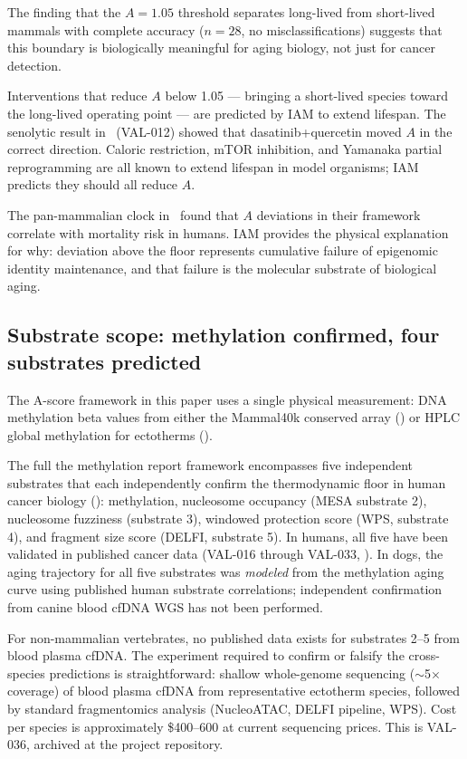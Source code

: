 \documentclass[11pt,a4paper]{article}
\newcommand{\Ascore}{A}
\begin{document}
The finding that the $\Ascore = 1.05$ threshold separates long-lived from
short-lived mammals with complete accuracy ($n = 28$, no misclassifications)
suggests that this boundary is biologically meaningful for aging biology,
not just for cancer detection.

Interventions that reduce $\Ascore$ below 1.05 --- bringing a short-lived
species toward the long-lived operating point --- are predicted by IAM to
extend lifespan. The senolytic result in~\citet{Mahaffey2026} (VAL-012)
showed that dasatinib+quercetin moved $\Ascore$ in the correct direction.
Caloric restriction, mTOR inhibition, and Yamanaka partial reprogramming
are all known to extend lifespan in model organisms; IAM predicts they
should all reduce $\Ascore$.

The pan-mammalian clock in~\citet{Lu2023} found that $\Ascore$ deviations
in their framework correlate with mortality risk in humans. IAM provides
the physical explanation for why: deviation above the floor represents
cumulative failure of epigenomic identity maintenance, and that failure
is the molecular substrate of biological aging.




\subsection{Substrate scope: methylation confirmed, four substrates predicted}
\label{sec:substrates}

The A-score framework in this paper uses a single physical measurement:
DNA methylation beta values from either the Mammal40k conserved array
(\citealt{Lowe2018,Lu2023}) or HPLC global methylation for ectotherms
(\citealt{Varriale2006_fish,Varriale2006_reptile}).

The full the methylation report framework encompasses five independent substrates that each
independently confirm the thermodynamic floor in human cancer biology
(\citealt{Mahaffey2026}): methylation, nucleosome occupancy (MESA substrate 2),
nucleosome fuzziness (substrate 3), windowed protection score (WPS, substrate 4),
and fragment size score (DELFI, substrate 5). In humans, all five have been
validated in published cancer data (VAL-016 through VAL-033,
\citealt{Mahaffey2026}). In dogs, the aging trajectory for all five substrates
was \emph{modeled} from the methylation aging curve using published human
substrate correlations; independent confirmation from canine blood cfDNA WGS
has not been performed.

For non-mammalian vertebrates, no published data exists for substrates 2--5
from blood plasma cfDNA. The experiment required to confirm or falsify the
cross-species predictions is straightforward: shallow whole-genome sequencing
($\sim$5$\times$ coverage) of blood plasma cfDNA from representative ectotherm
species, followed by standard fragmentomics analysis (NucleoATAC, DELFI pipeline,
WPS). Cost per species is approximately \$400--600 at current sequencing prices.
This is VAL-036, archived at the project repository.
\end{document}
